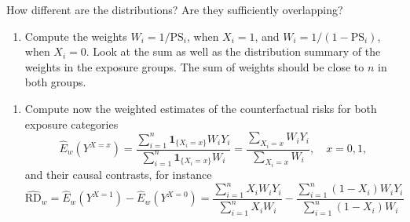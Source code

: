 \documentclass[
]{book}
\newenvironment{Shaded}{\begin{snugshade}}{\end{snugshade}}
\newcommand{\AttributeTok}[1]{\textcolor[rgb]{0.13,0.29,0.53}{#1}}
\newcommand{\DecValTok}[1]{\textcolor[rgb]{0.00,0.00,0.81}{#1}}
\newcommand{\FunctionTok}[1]{\textcolor[rgb]{0.13,0.29,0.53}{\textbf{#1}}}
\newcommand{\NormalTok}[1]{#1}
\newcommand{\OtherTok}[1]{\textcolor[rgb]{0.56,0.35,0.01}{#1}}
\newcommand{\SpecialCharTok}[1]{\textcolor[rgb]{0.81,0.36,0.00}{\textbf{#1}}}
\newcommand{\StringTok}[1]{\textcolor[rgb]{0.31,0.60,0.02}{#1}}
\providecommand{\tightlist}{%
  \setlength{\itemsep}{0pt}\setlength{\parskip}{0pt}}
\begin{document}
\begin{Shaded}
\end{Shaded}

How different are the distributions? Are they sufficiently overlapping?

\begin{enumerate}
\def\labelenumi{\arabic{enumi}.}
\setcounter{enumi}{2}
\tightlist
\item
  Compute the weights \(W_i = 1/\text{PS}_i\), when \(X_i=1\),
  and \(W_i = 1/(1-\text{PS}_i)\), when \(X_i=0\).
  Look at the sum as well as the distribution summary
  of the weights in the exposure groups. The sum of weights
  should be close to \(n\) in both groups.
\end{enumerate}

\begin{Shaded}
\end{Shaded}

\begin{enumerate}
\def\labelenumi{\arabic{enumi}.}
\setcounter{enumi}{3}
\tightlist
\item
  Compute now the weighted estimates of the
  counterfactual risks for both exposure categories
  \[ \widehat{E}_w(Y^{X = x}) =
  \frac{ \sum_{i=1}^n {\mathbf 1}_{ \{X_i=x\} } W_i Y_i }
     {\sum_{i=1}^n {\mathbf 1}_{ \{X_i=x\} }W_i} =
   \frac{ \sum_{X_i = x} W_i Y_i }{\sum_{X_i=x} W_i}, \quad x = 0,1, \]
  and their causal contrasts, for instance
  \[ \widehat{\text{RD}}_{w} = \widehat{E}_w(Y^{X = 1}) -
                \widehat{E}_w(Y^{X = 0})
   =   \frac{ \sum_{i=1}^n X_i W_i Y_i }{\sum_{i=1}^n X_i W_i} -
      \frac{ \sum_{i=1}^n (1-X_i) W_i Y_i }{\sum_{i=1}^n (1-X_i) W_i}
  \]
\end{enumerate}
\end{document}
